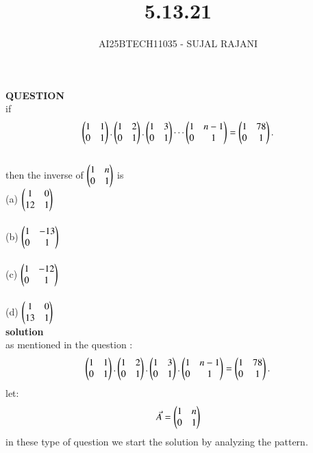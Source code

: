 \documentclass[journal,12pt,onecolumn]{IEEEtran}
\begin{document}
\title{5.13.21}
\author{AI25BTECH11035 - SUJAL RAJANI}
{\let\newpage\relax\maketitle}
\textbf{QUESTION}
\\
if 
\begin{align*}
    \begin{pmatrix}1&1\\0&1\end{pmatrix}.\begin{pmatrix}1&2\\0&1\end{pmatrix}.\begin{pmatrix}1&3\\0&1\end{pmatrix}\cdots\begin{pmatrix}1&n-1\\0&1\end{pmatrix}=\begin{pmatrix}1&78\\0&1\end{pmatrix}.
\end{align*}
\\
then the inverse of $\begin{pmatrix}1&n\\0&1\end{pmatrix}$ is 
  \\
  (a) $\begin{pmatrix}1&0\\12&1\end{pmatrix}$
  \\
  \\
  (b) $\begin{pmatrix}1&-13\\0&1\end{pmatrix}$
  \\
  \\
  (c) $\begin{pmatrix}1&-12\\0&1\end{pmatrix}$
  \\
  \\
  (d) $\begin{pmatrix}1&0\\13&1\end{pmatrix}$
  \\
\textbf{solution}
\\
as mentioned in the question :
\\
\begin{align*}
    \begin{pmatrix}1&1\\0&1\end{pmatrix}.\begin{pmatrix}1&2\\0&1\end{pmatrix}.\begin{pmatrix}1&3\\0&1\end{pmatrix}.\begin{pmatrix}1&n-1\\0&1\end{pmatrix}=\begin{pmatrix}1&78\\0&1\end{pmatrix}.
\end{align*}
let:
\begin{equation*}
   \Vec{A}=\begin{pmatrix}1&n\\0&1\end{pmatrix}
\end{equation*}
in these type of question we start the solution by analyzing the pattern. 
\end{document}
